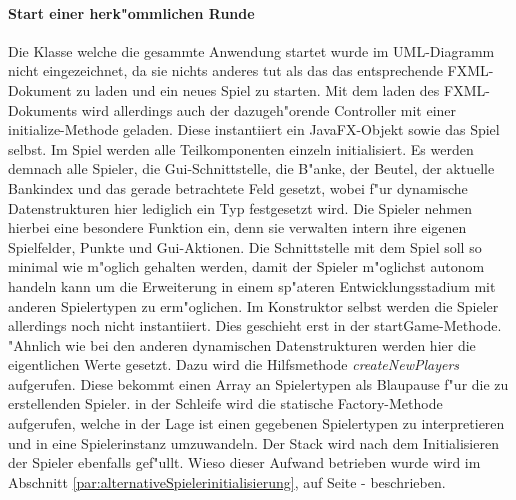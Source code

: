 \paragraph{Start einer herk"ommlichen Runde}
Die Klasse welche die gesammte Anwendung startet wurde im UML-Diagramm nicht eingezeichnet, da sie nichts anderes tut als das das entsprechende FXML-Dokument zu laden und ein neues Spiel zu starten. Mit dem laden des FXML-Dokuments wird allerdings auch der dazugeh"orende Controller mit einer initialize-Methode geladen. Diese instantiiert ein JavaFX-Objekt sowie das Spiel selbst. Im Spiel werden alle Teilkomponenten einzeln initialisiert. Es werden demnach alle Spieler, die Gui-Schnittstelle, die B"anke, der Beutel, der aktuelle Bankindex und das gerade betrachtete Feld gesetzt, wobei f"ur dynamische Datenstrukturen hier lediglich ein Typ festgesetzt wird. Die Spieler nehmen hierbei eine besondere Funktion ein, denn sie verwalten intern ihre eigenen Spielfelder, Punkte und Gui-Aktionen. Die Schnittstelle mit dem Spiel soll so minimal wie m"oglich gehalten werden, damit der Spieler m"oglichst autonom handeln kann um die Erweiterung in einem sp"ateren Entwicklungsstadium mit anderen Spielertypen zu erm"oglichen. Im Konstruktor selbst werden die Spieler allerdings noch nicht instantiiert. Dies geschieht erst in der startGame-Methode. "Ahnlich wie bei den anderen dynamischen Datenstrukturen werden hier die eigentlichen Werte gesetzt. Dazu wird die Hilfsmethode \emph{createNewPlayers} aufgerufen. Diese bekommt einen Array an Spielertypen als \glqq Blaupause\grqq {} f"ur die zu erstellenden Spieler. in der Schleife wird die statische Factory-Methode aufgerufen, welche in der Lage ist einen gegebenen Spielertypen zu interpretieren und in eine Spielerinstanz umzuwandeln. Der Stack wird nach dem Initialisieren der Spieler ebenfalls gef"ullt. Wieso dieser Aufwand betrieben wurde wird im Abschnitt \ref{par:alternativeSpielerinitialisierung}, auf Seite \pageref{par:alternativeSpielerinitialisierung} -  beschrieben. 
